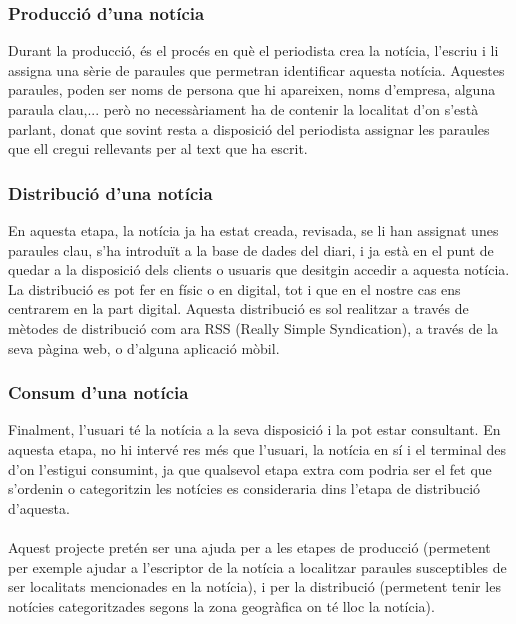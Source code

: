 \documentclass[12pt,a4paper,openright,oneside]{article}
\numberwithin{equation}{section}
\theoremstyle{definition}
\begin{document}
\subsubsection*{Producció d'una notícia}
Durant la producció, és el procés en què el periodista crea la notícia, l'escriu i li assigna una sèrie de paraules que permetran identificar aquesta notícia. Aquestes paraules, poden ser noms de persona que hi apareixen, noms d'empresa, alguna paraula clau,... però no necessàriament ha de contenir la localitat d'on s'està parlant, donat que sovint resta a disposició del periodista assignar les paraules que ell cregui rellevants per al text que ha escrit.\\
\subsubsection*{Distribució d'una notícia}
En aquesta etapa, la notícia ja ha estat creada, revisada, se li han assignat unes paraules clau, s'ha introduït a la base de dades del diari, i ja està en el punt de quedar a la disposició dels clients o usuaris que desitgin accedir a aquesta notícia. La distribució es pot fer en físic o en digital, tot i que en el nostre cas ens centrarem en la part digital. Aquesta distribució es sol realitzar a través de mètodes de distribució com ara RSS (Really Simple Syndication), a través de la seva pàgina web, o d'alguna aplicació mòbil.\\
\subsubsection*{Consum d'una notícia}
Finalment, l'usuari té la notícia a la seva disposició i la pot estar consultant. En aquesta etapa, no hi intervé res més que l'usuari, la notícia en sí i el terminal des d'on l'estigui consumint, ja que qualsevol etapa extra com podria ser el fet que s'ordenin o categoritzin les notícies es consideraria dins l'etapa de distribució d'aquesta.
\\\\
Aquest projecte pretén ser una ajuda per a les etapes de producció (permetent per exemple ajudar a l'escriptor de la notícia a localitzar paraules susceptibles de ser localitats mencionades en la notícia), i per la distribució (permetent tenir les notícies categoritzades segons la zona geogràfica on té lloc la notícia).
\end{document}
